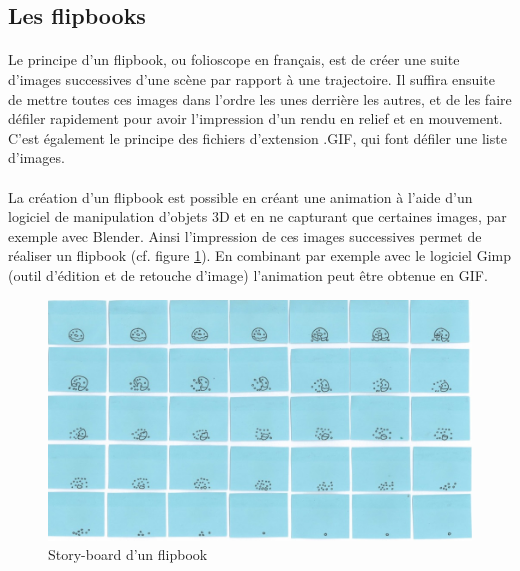 \subsection{Les flipbooks}

\paragraph{}
	Le principe d’un flipbook, ou folioscope en français, est de créer une suite d’images successives d’une scène par rapport à une trajectoire. Il suffira ensuite de mettre toutes ces images dans l’ordre les unes derrière les autres, et de les faire défiler rapidement pour avoir l’impression d’un rendu en relief et en mouvement. C’est également le principe des fichiers d’extension .GIF, qui font défiler une liste d’images.

        
\paragraph{}
	La création d’un flipbook est possible en créant une animation à l’aide d’un logiciel de manipulation d’objets 3D et en ne capturant que certaines images, par exemple avec Blender. Ainsi l’impression de ces images successives permet de réaliser un flipbook (cf. figure \ref{fig:flipbook}). En combinant par exemple avec le logiciel Gimp (outil d’édition et de retouche d’image) l’animation peut être obtenue en GIF. 

\begin{figure}[h!]
		\centering
		\includegraphics[scale=0.7]{flipbook.png}
		\caption{\label{fig:flipbook} Story-board d’un flipbook \protect \footnotemark }
\end{figure}

